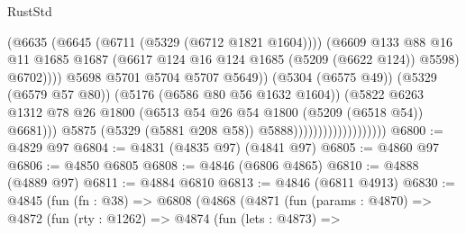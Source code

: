 \begin{lexlean}{RustStd}
\begin{coremodule}
                                                    (@6635
                                                      (@6645 (@6711 (@5329 (@6712 @1821 @1604))))
                                                      (@6609
                                                        @133
                                                        @88
                                                        @16
                                                        @11
                                                        @1685
                                                        @1687
                                                        (@6617
                                                          @124
                                                          @16
                                                          @124
                                                          @1685
                                                          (@5209 (@6622 @124))
                                                          @5598)
                                                        @6702))))
                                                @5698
                                                @5701
                                                @5704
                                                @5707
                                                @5649))
                                            (@5304 (@6575 @49))
                                            (@5329 (@6579 @57 @80))
                                            (@5176 (@6586 @80 @56 @1632 @1604))
                                            (@5822
                                              @6263
                                              @1312
                                              @78
                                              @26
                                              @1800
                                              (@6513 @54 @26 @54 @1800 (@5209 (@6518 @54)) @6681)))
                                          @5875
                                          (@5329 (@5881 @208 @58))
                                          @5888)))))))))))))))))))
@6800 := @4829 @97
@6804 := @4831 (@4835 @97) (@4841 @97)
@6805 := @4860 @97
@6806 := @4850 @6805
@6808 := @4846 (@6806 @4865)
@6810 := @4888 (@4889 @97)
@6811 := @4884 @6810
@6813 := @4846 (@6811 @4913)
@6830 := @4845
    (fun (fn : @38) =>
    @6808
      (@4868
        (@4871
          (fun (params : @4870) =>
          @4872
            (fun (rty : @1262) =>
            @4874
              (fun (lets : @4873) =>

\end{coremodule}
\end{lexlean}
